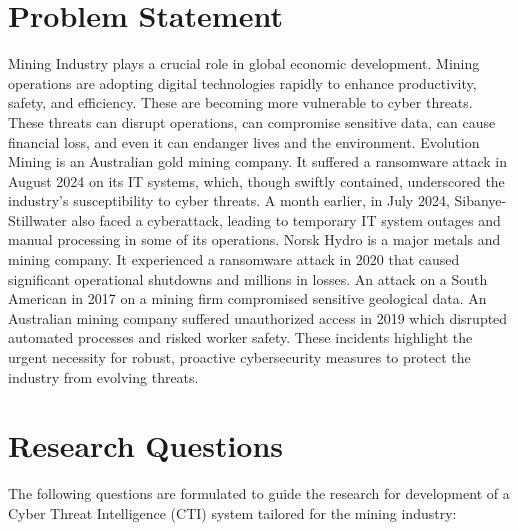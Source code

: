 \documentclass[a4paper,twoside,12pt]{report}
\begin{document}
\section{Problem Statement}
Mining Industry plays a crucial role in global economic development. Mining operations are adopting digital technologies rapidly to enhance productivity, safety, and efficiency. These are becoming more vulnerable to cyber threats. These threats can disrupt operations, can compromise sensitive data, can cause financial loss, and even it can endanger lives and the environment. Evolution Mining is an Australian gold mining company. It suffered a ransomware attack in August 2024 on its IT systems, which, though swiftly contained, underscored the industry's susceptibility to cyber threats. A month earlier, in July 2024, Sibanye-Stillwater also faced a cyberattack, leading to temporary IT system outages and manual processing in some of its operations. Norsk Hydro is a major metals and mining company. It experienced a ransomware attack in 2020 that caused significant operational shutdowns and millions in losses.
An attack on a South American in 2017 on a mining firm compromised sensitive geological data. An Australian mining company suffered unauthorized access in 2019 which disrupted automated processes and risked worker safety.
These incidents highlight the urgent necessity for robust, proactive cybersecurity measures to protect the industry from evolving threats.





\section{Research Questions}

The following questions are formulated to guide the research for development of a Cyber Threat Intelligence (CTI) system tailored for the mining industry:
\end{document}

